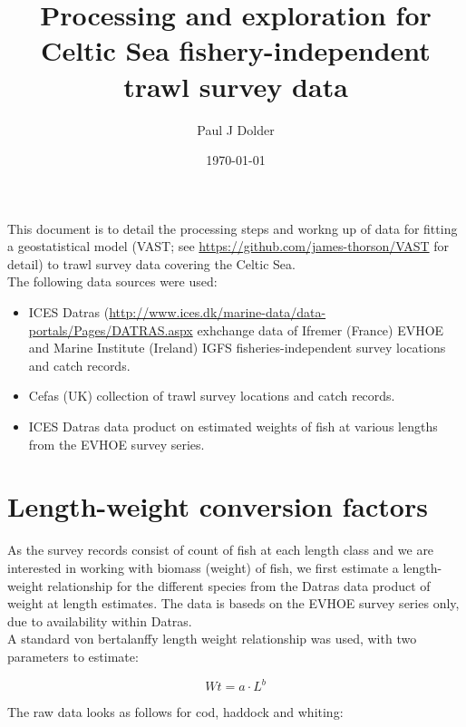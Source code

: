 \documentclass[12pt]{article}\usepackage[]{graphicx}\usepackage[]{color}
\title{Processing and exploration for Celtic Sea fishery-independent trawl
	survey data}
\author{Paul J Dolder}
\date{\today}
\begin{document}
\maketitle

This document is to detail the processing steps and workng up of data for fitting
a geostatistical model (VAST; see \url{https://github.com/james-thorson/VAST}
for detail) to trawl survey data covering the Celtic Sea. \\

The following data sources were used:

\begin{itemize}
	\item ICES Datras
		(\url{http://www.ices.dk/marine-data/data-portals/Pages/DATRAS.aspx}
		exhchange data of Ifremer (France) EVHOE and Marine Institute
		(Ireland) IGFS fisheries-independent survey locations and catch
		records.
	\item Cefas (UK) collection of trawl survey locations and catch
		records.
	\item ICES Datras data product on estimated weights of fish at various
		lengths from the EVHOE survey series.
\end{itemize}

\section{Length-weight conversion factors}

As the survey records consist of count of fish at each length class and we are
interested in working with biomass (weight) of fish, we first estimate a
length-weight relationship for the different species from the Datras data
product of weight at length estimates. The data is baseds on the EVHOE survey
series only, due to availability within Datras. \\

A standard von bertalanffy length weight relationship was used, with two
parameters to estimate:

\begin{equation}\label{eq:1}
	Wt = a \cdot L^b
\end{equation}

The raw data looks as follows for cod, haddock and whiting:
\end{document}
